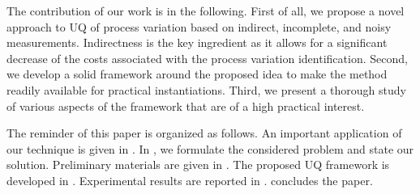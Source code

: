 The contribution of our work is in the following. First of all, we propose a novel approach to UQ of process variation based on indirect, incomplete, and noisy measurements. Indirectness is the key ingredient as it allows for a significant decrease of the costs associated with the process variation identification. Second, we develop a solid framework around the proposed idea to make the method readily available for practical instantiations. Third, we present a thorough study of various aspects of the framework that are of a high practical interest.

The reminder of this paper is organized as follows. An important application of our technique is given in . In , we formulate the considered problem and state our solution. Preliminary materials are given in . The proposed UQ framework is developed in . Experimental results are reported in .  concludes the paper.
